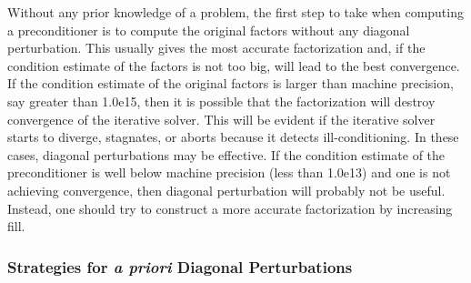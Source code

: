 \documentclass[12pt,relax]{AztecOOUserGuide}
\begin{document}
Without any prior knowledge of a problem, the first step to take when
computing a preconditioner is to compute the original factors without
any diagonal perturbation.  This usually gives the most accurate
factorization and, if the condition estimate of the factors is not too
big, will lead to the best convergence.  If the condition estimate of
the original factors is larger than machine precision, say greater
than 1.0e15, then it is possible that the factorization will destroy
convergence of the iterative solver.  This will be evident if the
iterative solver starts to diverge, stagnates, or aborts because
it detects ill-conditioning.  In these cases, diagonal perturbations
may be effective.  If the condition estimate of the preconditioner is
well below machine precision (less than 1.0e13) and one is not achieving
convergence, then diagonal perturbation will probably not be useful.
Instead, one should try to construct a more accurate factorization by
increasing fill.

\subsubsection{Strategies for {\bf\it a priori} Diagonal Perturbations}
\end{document}
